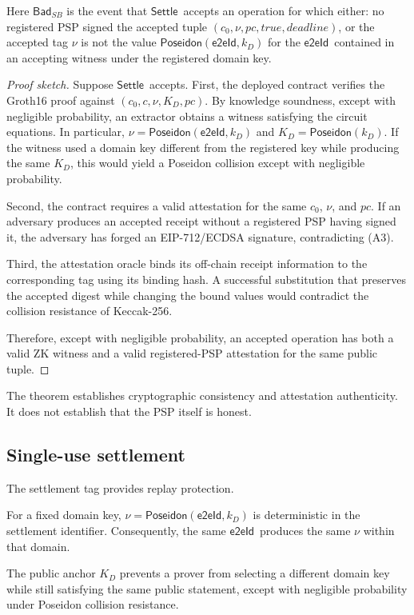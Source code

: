 \documentclass[10pt,twocolumn]{article}
\newcommand{\Poseidon}{\ensuremath{\mathsf{Poseidon}}}
\newcommand{\eeid}{\ensuremath{\mathsf{e2eId}}}
\newcommand{\pc}{\ensuremath{\mathit{pc}}}
\newcommand{\Settle}{\ensuremath{\mathsf{Settle}}}
\begin{document}
Here $\mathsf{Bad}_{SB}$ is the event that \Settle\ accepts an operation
for which either: no registered PSP signed the accepted tuple
$(c_0,\nu,\pc,\mathit{true},\mathit{deadline})$, or the accepted tag
$\nu$ is not the value $\Poseidon(\eeid,k_D)$ for the \eeid\ contained in
an accepting witness under the registered domain key.

\begin{proof}[Proof sketch]
Suppose \Settle\ accepts. First, the deployed contract verifies the
Groth16 proof against $(c_0,c,\nu,K_D,\pc)$. By knowledge soundness,
except with negligible probability, an extractor obtains a witness
satisfying the circuit equations. In particular,
$\nu=\Poseidon(\eeid,k_D)$ and $K_D=\Poseidon(k_D)$. If the witness used
a domain key different from the registered key while producing the same
$K_D$, this would yield a Poseidon collision except with negligible
probability.

Second, the contract requires a valid attestation for the same $c_0$,
$\nu$, and \pc. If an adversary produces an accepted receipt without a
registered PSP having signed it, the adversary has forged an
EIP-712/ECDSA signature, contradicting (A3).

Third, the attestation oracle binds its off-chain receipt information to
the corresponding tag using its binding hash. A successful substitution
that preserves the accepted digest while changing the bound values would
contradict the collision resistance of Keccak-256.

Therefore, except with negligible probability, an accepted operation has
both a valid ZK witness and a valid registered-PSP attestation for the
same public tuple.
\end{proof}

The theorem establishes cryptographic consistency and attestation
authenticity. It does not establish that the PSP itself is honest.

\subsection{Single-use settlement}
\label{sec:single-use}

The settlement tag provides replay protection.

For a fixed domain key, $\nu=\Poseidon(\eeid,k_D)$ is deterministic in
the settlement identifier. Consequently, the same \eeid\ produces the
same $\nu$ within that domain.

The public anchor $K_D$ prevents a prover from selecting a different
domain key while still satisfying the same public statement, except with
negligible probability under Poseidon collision resistance.
\end{document}

